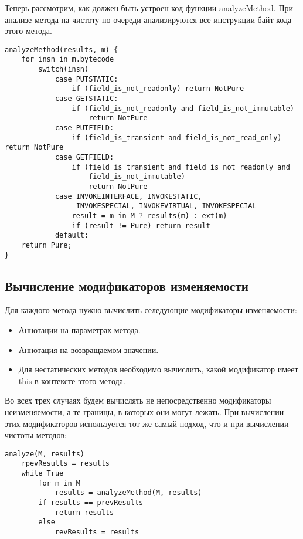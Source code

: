 Теперь рассмотрим, как должен быть устроен код функции analyzeMethod. При анализе метода на чистоту по очереди анализируются все инструкции байт-кода этого метода. 

\begin{lstlisting}[caption=Анализ чистоты методов, label=code:purity_analyze_method]
analyzeMethod(results, m) {
    for insn in m.bytecode 
		switch(insn) 
		    case PUTSTATIC:
		        if (field_is_not_readonly) return NotPure
		    case GETSTATIC:
		        if (field_is_not_readonly and field_is_not_immutable) 
		            return NotPure
		    case PUTFIELD:
		        if (field_is_transient and field_is_not_read_only) return NotPure
		    case GETFIELD:
		        if (field_is_transient and field_is_not_readonly and
		            field_is_not_immutable)        
		            return NotPure
		    case INVOKEINTERFACE, INVOKESTATIC, 
		         INVOKESPECIAL, INVOKEVIRTUAL, INVOKESPECIAL
		        result = m in M ? results(m) : ext(m)
		        if (result != Pure) return result
		    default:       
    return Pure;        
}
\end{lstlisting}

\subsection{Вычисление модификаторов изменяемости} 

Для каждого метода нужно вычислить селедующие модификаторы изменяемости:
\begin{itemize}
    \item Аннотации на параметрах метода.
    \item Аннотация на возвращаемом значении.
    \item Для нестатических методов необходимо вычислить, какой модификатор имеет this в контексте этого метода.
\end{itemize}

Во всех трех случаях будем вычислять не непосредственно модификаторы неизменяемости, а те границы, в которых они могут лежать. При вычислении этих модификаторов используется тот же самый подход, что и при вычислении чистоты методов:

\begin{lstlisting}[caption=Анализ модификаторов изменяемости для методов, label=code:mutability]
analyze(M, results)
    rpevResults = results    
    while True 
        for m in M 
            results = analyzeMethod(M, results)
        if results == prevResults 
            return results        
        else 
            revResults = results
\end{lstlisting}

